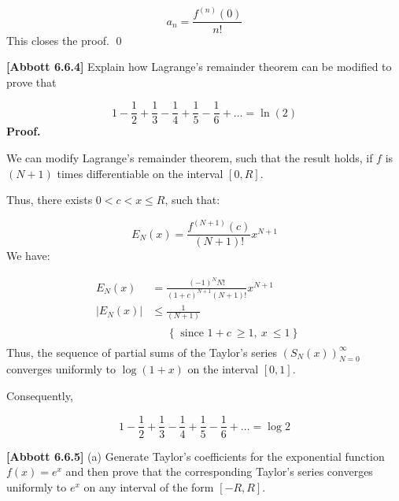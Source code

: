 \documentclass[10pt]{article}
\begin{document}
\begin{equation*}
a_{n} =\frac{f^{( n)}( 0)}{n!}
\end{equation*}
This closes the proof. \qed 



\textbf{[Abbott 6.6.4]} Explain how Lagrange's remainder theorem can be modified to prove that 


\begin{equation*}
1-\frac{1}{2} +\frac{1}{3} -\frac{1}{4} +\frac{1}{5} -\frac{1}{6} +\dotsc =\ln( 2)
\end{equation*}
\textbf{Proof.}



We can modify Lagrange's remainder theorem, such that the result holds, if $\displaystyle f$ is $\displaystyle ( N+1)$ times differentiable on the interval $\displaystyle [ 0,R]$. 



Thus, there exists $\displaystyle 0< c< x\leq R$, such that:


\begin{equation*}
E_{N}( x) =\frac{f^{( N+1)}( c)}{( N+1) !} x^{N+1}
\end{equation*}
We have:


\begin{equation*}
\begin{aligned}
E_{N}( x) & =\frac{( -1)^{N} N!}{( 1+c)^{N+1}( N+1) !} x^{N+1} & \\
|E_{N}( x) | & \leq \frac{1}{( N+1)} & \\
 &  \begin{array}{l}
\quad \left\{\text{ since } 1+c\ \geq 1,\ x\ \leq 1\right\}
\end{array} & 
\end{aligned}
\end{equation*}
Thus, the sequence of partial sums of the Taylor's series $\displaystyle ( S_{N}( x))_{N=0}^{\infty }$ converges uniformly to $\displaystyle \log( 1+x)$ on the interval $\displaystyle [ 0,1]$. 



Consequently,


\begin{equation*}
1-\frac{1}{2} +\frac{1}{3} -\frac{1}{4} +\frac{1}{5} -\frac{1}{6} +\dotsc =\log 2
\end{equation*}
 

\textbf{[Abbott 6.6.5]} (a) Generate Taylor's coefficients for the exponential function $\displaystyle f( x) =e^{x}$ and then prove that the corresponding Taylor's series converges uniformly to $\displaystyle e^{x}$ on any interval of the form $\displaystyle [ -R,R]$. 
\end{document}
